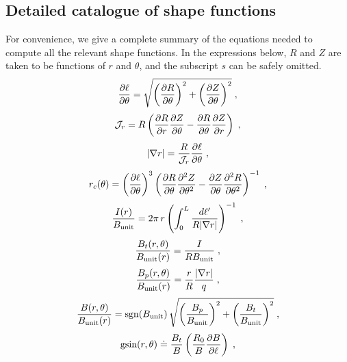 \subsection{Detailed catalogue of shape functions}\label{sec.catalog}

For convenience, we give a complete summary of the 
equations needed to compute all the relevant shape functions.
In the expressions below, $R$ and $Z$ are taken to be 
functions of $r$ and $\theta$, and the subscript $s$ can be 
safely omitted. 
%
\begin{equation}
\frac{\partial\ell}{\partial\theta} = \sqrt{\left( 
  \frac{\partial R}{\partial\theta} \right)^2
+ \left( \frac{\partial Z}{\partial\theta} \right)^2} \; ,
\end{equation}
%
\begin{equation}
{\mathcal J}_r = R \left( 
 \frac{\partial R}{\partial r}\frac{\partial Z}{\partial\theta} - 
 \frac{\partial R}{\partial\theta}\frac{\partial Z}{\partial r}
\right)\; ,
\end{equation}
%
\begin{equation}
\left| \nabla r \right| = \frac{R}{{\mathcal J}_r}
  \frac{\partial\ell}{\partial\theta} \; ,
\end{equation}
%
\begin{equation}
r_c(\theta) = \left(\frac{\partial\ell}{\partial\theta}\right)^3 \left( 
\frac{\partial R}{\partial\theta}\frac{\partial^2 Z}{\partial\theta^2}-
\frac{\partial Z}{\partial\theta}\frac{\partial^2 R}{\partial\theta^2}
\right)^{-1} \; ,
\end{equation}
%
\begin{equation}
\frac{I(r)}{B_{\rm unit}} = 2\pi \, r \left( \int_0^L \frac{d\ell^\prime}{R |\nabla r|} \right)^{-1} \; , 
\label{eq.fobu}
\end{equation}
%
\begin{equation}
\frac{B_t(r,\theta)}{B_{\rm unit}(r)} = \frac{I}{RB_{\rm unit}}\; ,
\end{equation}
%
\begin{equation}
\frac{B_p(r,\theta)}{B_{\rm unit}(r)} = \frac{r}{R}\frac{|\nabla r|}{q} \; ,
\end{equation}
%
\begin{equation}
\frac{B(r,\theta)}{B_{\rm unit}(r)} = \mathrm{sgn}(B_{\rm unit}) \, \sqrt{
 \left(\frac{B_p}{B_{\rm unit}}\right)^2+\left(\frac{B_t}{B_{\rm unit}}\right)^2} \; ,
\end{equation}
%
\begin{equation}
\text{gsin}(r,\theta) \doteq \frac{B_t}{B} 
\left(\frac{R_0}{B}\frac{\partial B}{\partial\ell}\right) \; ,
\end{equation}
